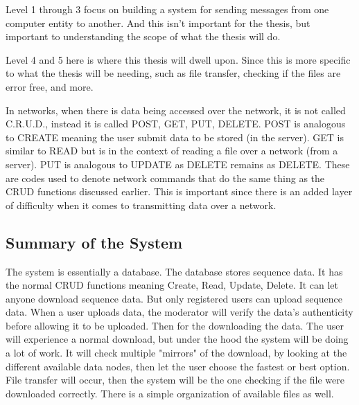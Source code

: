\documentclass{article}
\begin{document}
Level 1 through 3 focus on building a system for sending messages from one computer entity to another. And this isn't important for the thesis, but important to understanding the scope of what the thesis will do.

Level 4 and 5 here is where this thesis will dwell upon. Since this is more specific to what the thesis will be needing, such as file transfer, checking if the files are error free, and more.



In networks, when there is data being accessed over the network, it is not called C.R.U.D., instead it is called POST, GET, PUT, DELETE. POST is analogous to CREATE meaning the user submit data to be stored (in the server). GET is similar to READ but is in the context of reading a file over a network (from a server). PUT is analogous to UPDATE as DELETE remains as DELETE. These are codes used to denote network commands that do the same thing as the CRUD functions discussed earlier. This is important since there is an added layer of difficulty when it comes to transmitting data over a network.


\subsection{Summary of the System}
The system is essentially a database. The database stores sequence data. It has the normal CRUD functions meaning Create, Read, Update, Delete. It can let anyone download sequence data. But only registered users can upload sequence data. When a user uploads data, the moderator will verify the data's authenticity before allowing it to be uploaded. Then for the downloading the data. The user will experience a normal download, but under the hood the system will be doing a lot of work. It will check multiple "mirrors" of the download, by looking at the different available data nodes, then let the user choose the fastest or best option. File transfer will occur, then the system will be the one checking if the file were downloaded correctly. There is a simple organization of available files as well.

\end{document}
